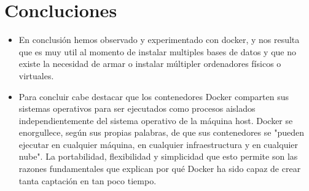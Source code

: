 \section{Concluciones}
\begin{itemize}
	\item En conclusión hemos observado y experimentado con docker, y nos resulta que es muy util al momento de instalar multiples bases de datos y que no existe la necesidad de armar o instalar múltipler ordenadores físicos o virtuales.
	
	\item Para concluir cabe destacar que los contenedores Docker comparten sus sistemas operativos para ser ejecutados como procesos aislados independientemente del sistema operativo de la máquina host. Docker se enorgullece, según sus propias palabras, de que sus contenedores se "pueden ejecutar en cualquier máquina, en cualquier infraestructura y en cualquier nube". La portabilidad, flexibilidad y simplicidad que esto permite son las razones fundamentales que explican por qué Docker ha sido capaz de crear tanta captación en tan poco tiempo.
\end{itemize}

\newpage
